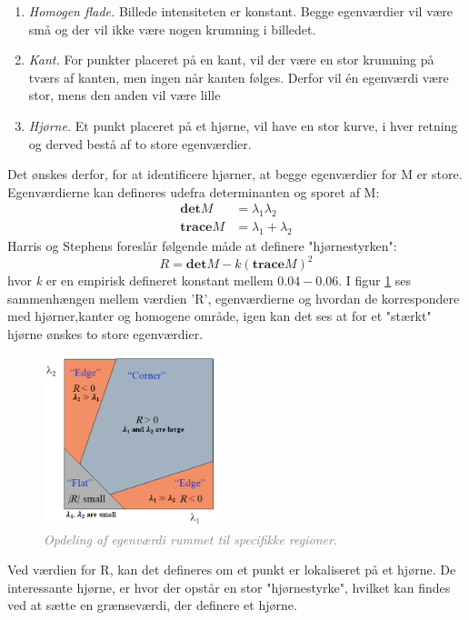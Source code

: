 \begin{enumerate}
{\begin{enumerate}
\item{ \textit{Homogen flade.} Billede intensiteten er konstant. Begge egenværdier vil være små og der vil ikke være nogen krumning i billedet.}
\item{\textit{Kant.} For punkter placeret på en kant, vil der være en stor krumning på tværs af kanten, men ingen når kanten følges. Derfor vil én egenværdi være stor, mens den anden vil være lille}
\item{\textit{Hjørne.} Et punkt placeret på et hjørne, vil have en stor kurve, i hver retning og derved bestå af to store egenværdier.}
\end{enumerate}
Det ønskes derfor, for at identificere hjørner, at begge egenværdier for M er store. Egenværdierne kan defineres udefra determinanten og sporet af M:
\begin{subequations}
\begin{align}
\textbf{det}M & = \lambda_1 \lambda_2 \\
\textbf{trace}M & = \lambda_1+\lambda_2
\end{align}
\end{subequations}
Harris og Stephens foreslår følgende måde at definere "hjørnestyrken":
\begin{equation}
R = \textbf{det}M-k(\textbf{trace}M)^2
\end{equation}
hvor \textit{k} er en empirisk defineret konstant mellem $0.04-0.06$. I figur \ref{fig:egen} ses sammenhængen mellem værdien 'R', egenværdierne og hvordan de korrespondere med hjørner,kanter og homogene område, igen kan det ses at for et "stærkt" hjørne ønskes to store egenværdier.

\begin{figure}[H]
    \centering
    \includegraphics[width=0.45\textwidth]{fig/26.png}
     \vspace{-1em}
    \begin{center}    
       \caption{\textcolor{gray}{\footnotesize \textit{ Opdeling af egenværdi rummet til specifikke regioner. }}}
    \label{fig:egen}
     \end{center}
     \vspace{-2.5em}
  \end{figure} \noindent
Ved værdien for R, kan det defineres om et punkt er lokaliseret på et hjørne. De interessante hjørne, er hvor der opstår en stor "hjørnestyrke", hvilket kan findes ved at sætte en grænseværdi, der definere et hjørne.
 }
\end{enumerate}
